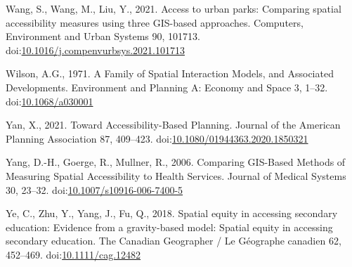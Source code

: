 \documentclass[]{elsarticle} %
\newlength{\cslhangindent}
\newlength{\cslentryspacingunit} %
\newenvironment{CSLReferences}[2] %
 {%
  \setlength{\parindent}{0pt}
  \ifodd #1
  \let\oldpar\par
  \def\par{\hangindent=\cslhangindent\oldpar}
  \fi
  \setlength{\parskip}{#2\cslentryspacingunit}
 }%
 {}
\begin{document}
\begin{CSLReferences}{1}{0}
\leavevmode{}%
Wang, S., Wang, M., Liu, Y., 2021. Access to urban parks: {Comparing}
spatial accessibility measures using three {GIS}-based approaches.
Computers, Environment and Urban Systems 90, 101713.
doi:\href{https://doi.org/10.1016/j.compenvurbsys.2021.101713}{10.1016/j.compenvurbsys.2021.101713}

\leavevmode{}%
Wilson, A.G., 1971. A Family of Spatial Interaction Models, and
Associated Developments. Environment and Planning A: Economy and Space
3, 1--32. doi:\href{https://doi.org/10.1068/a030001}{10.1068/a030001}

\leavevmode{}%
Yan, X., 2021. Toward Accessibility-Based Planning. Journal of the
American Planning Association 87, 409--423.
doi:\href{https://doi.org/10.1080/01944363.2020.1850321}{10.1080/01944363.2020.1850321}

\leavevmode{}%
Yang, D.-H., Goerge, R., Mullner, R., 2006. Comparing {GIS}-{Based}
{Methods} of {Measuring} {Spatial} {Accessibility} to {Health}
{Services}. Journal of Medical Systems 30, 23--32.
doi:\href{https://doi.org/10.1007/s10916-006-7400-5}{10.1007/s10916-006-7400-5}

\leavevmode{}%
Ye, C., Zhu, Y., Yang, J., Fu, Q., 2018. Spatial equity in accessing
secondary education: {Evidence} from a gravity-based model: {Spatial}
equity in accessing secondary education. The Canadian Geographer / Le
Géographe canadien 62, 452--469.
doi:\href{https://doi.org/10.1111/cag.12482}{10.1111/cag.12482}

\end{CSLReferences}
\end{document}
